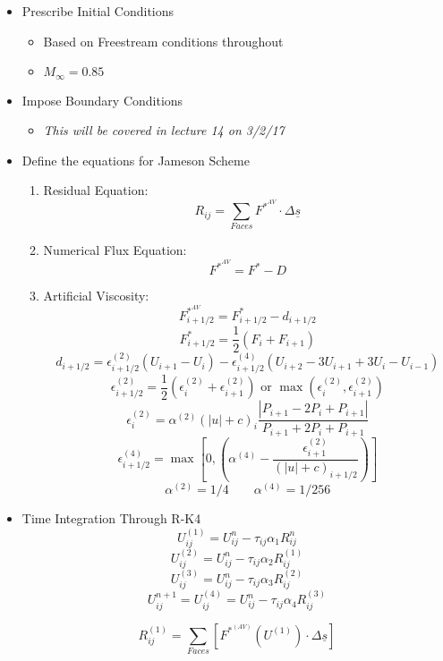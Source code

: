\documentclass[12pt]{article}
\begin{document}
\begin{itemize}
\begin{itemize}
    \end{itemize}
    \item Prescribe Initial Conditions
    \begin{itemize}
        \item Based on Freestream conditions throughout
        \item $M_{\infty} = 0.85$
    \end{itemize}
    \item Impose Boundary Conditions
    \begin{itemize}
        \item \textit{This will be covered in lecture 14 on 3/2/17}
    \end{itemize}
    \item Define the equations for Jameson Scheme
    \begin{enumerate}
        \item Residual Equation:
        $$ R_{ij} = \sum_{Faces} F^{*^{AV}}\cdot \Delta\underline{s} $$
        \item Numerical Flux Equation:
        $$ F^{*^{AV}} = F^* - D $$
        \item Artificial Viscosity:
        $$ F^{*^{AV}}_{i+1/2} = F^{*}_{i+1/2} - d_{i+1/2} $$
        $$ F^{*}_{i+1/2} = \frac 1 2 (F_i + F_{i+1} ) $$
        $$ d_{i+1/2} = \epsilon^{(2)}_{i+1/2}\left(U_{i+1} - U_i \right) - \epsilon^{(4)}_{i+1/2}\left(U_{i+2} - 3U_{i+1}+3 U_i - U_{i-1} \right) $$
        $$ \epsilon^{(2)}_{i+1/2} = \frac{1}{2} \left( \epsilon^{(2)}_{i}+ \epsilon^{(2)}_{i+1} \right)\text{ or } \max\left( \epsilon^{(2)}_{i}, \epsilon^{(2)}_{i+1} \right)$$
        $$ \epsilon^{(2)}_{i} = \alpha^{(2)}\left( |u| + c \right)_i \frac{| P_{i+1} - 2P_i+ P_{i+1} |}{P_{i+1} + 2P_i+ P_{i+1}}$$
        $$ \epsilon^{(4)}_{i+1/2} = \max\left[ 0, \left( \alpha^{(4)} - \frac{\epsilon^{(2)}_{i+1}}{\left( |u| + c \right)_{i+1/2}} \right) \right] $$
        $$\alpha^{(2)} = 1/4 \quad \quad \alpha^{(4)} = 1/256 $$
    \end{enumerate}
    \item Time Integration Through R-K4
    $$ U_{ij}^{(1)} = U_{ij}^n - \tau_{ij}\alpha_1 R^n_{ij} $$
    $$ U_{ij}^{(2)} = U_{ij}^n - \tau_{ij}\alpha_2 R^{(1)}_{ij} $$
    $$ U_{ij}^{(3)} = U_{ij}^n - \tau_{ij}\alpha_3 R^{(2)}_{ij} $$
    $$ U_{ij}^{n+1} = U_{ij}^{(4)} = U_{ij}^n - \tau_{ij}\alpha_4 R^{(3)}_{ij} $$
    
    $$ R_{ij}^{(1)} = \sum_{Faces} \left[ F^{*^{(AV)}}\left(U^{(1)}\right) \cdot \Delta\underline{s} \right] $$
    

\end{itemize}
\end{document}
